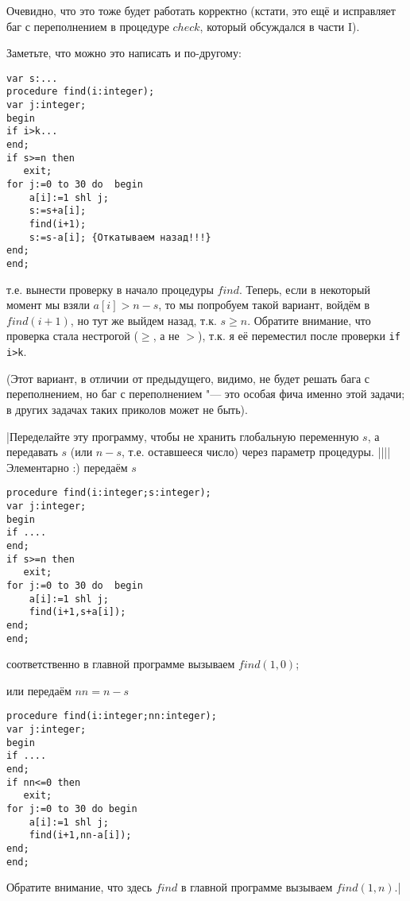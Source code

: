 Очевидно, что это тоже будет работать корректно (кстати, это ещё и исправляет баг с 
переполнением в процедуре $check$, который обсуждался в части I). 

Заметьте, что можно это написать и по-другому:

\begin{codesampleo}\begin{verbatim}
var s:...
procedure find(i:integer);
var j:integer;
begin
if i>k...
end;
if s>=n then
   exit;
for j:=0 to 30 do  begin
    a[i]:=1 shl j;
    s:=s+a[i];
    find(i+1);
    s:=s-a[i]; {Откатываем назад!!!}
end;
end;
\end{verbatim}\end{codesampleo}

т.е. вынести проверку в начало процедуры $find$. Теперь, если в некоторый момент мы взяли 
$a[i]>n-s$, то мы попробуем такой вариант, войдём в $find(i+1)$, но тут же выйдем назад, т.к. $s\geq n$. Обратите внимание, что проверка стала нестрогой ($\geq$, а не $>$), т.к. я её переместил после проверки \texttt{if i>k}.

(Этот вариант, в отличии от предыдущего, видимо, не будет решать бага с переполнением, но баг с переполнением "--- это особая фича именно этой задачи; в других задачах таких приколов может не быть).

\task|Переделайте эту программу, чтобы не хранить глобальную переменную $s$, а передавать $s$ (или $n-s$, т.е. оставшееся число) через параметр процедуры.
||||Элементарно :) передаём $s$
\begin{codesampleo}\begin{verbatim}
procedure find(i:integer;s:integer);
var j:integer;
begin
if ....
end;
if s>=n then
   exit;
for j:=0 to 30 do  begin
    a[i]:=1 shl j;
    find(i+1,s+a[i]);
end;
end;
\end{verbatim}\end{codesampleo}

соответственно в главной программе вызываем $find(1,0)$;

или передаём $nn=n-s$

\begin{codesampleo}\begin{verbatim}
procedure find(i:integer;nn:integer);
var j:integer;
begin
if ....
end;
if nn<=0 then
   exit;
for j:=0 to 30 do begin
    a[i]:=1 shl j;
    find(i+1,nn-a[i]);
end;
end;
\end{verbatim}\end{codesampleo}

Обратите внимание, что здесь $find$ в главной программе вызываем $find(1,n)$.|

